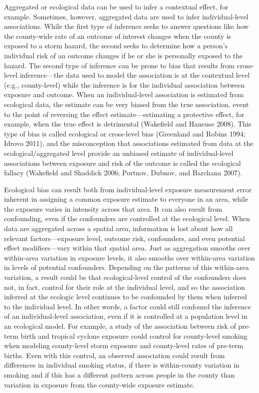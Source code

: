 \documentclass[]{article}
\begin{document}
Aggregated or ecological data can be used to infer a contextual effect,
for example. Sometimes, however, aggregated data are used to infer
individual-level associations. While the first type of inference seeks
to answer questions like how the county-wide rate of an outcome of
interest changes when the county is exposed to a storm hazard, the
second seeks to determine how a person's individual risk of an outcome
changes if he or she is personally exposed to the hazard. The second
type of inference can be prone to bias that results from cross-level
inference---the data used to model the association is at the contextual
level (e.g., county-level) while the inference is for the individual
association between exposure and outcome. When an individual-level
association is estimated from ecological data, the estimate can be very
biased from the true association, event to the point of reversing the
effect estimate---estimating a protective effect, for example, when the
true effect is detrimental (Wakefield and Haneuse 2008). This type of
bias is called ecological or cross-level bias (Greenland and Robins
1994; Idrovo 2011), and the misconception that associations estimated
from data at the ecological/aggregated level provide an unbiased
estimate of individual-level associations between exposure and risk of
the outcome is called the ecological fallacy (Wakefield and Shaddick
2006; Portnov, Dubnov, and Barchana 2007).

Ecological bias can result both from individual-level exposure
measurement error inherent in assigning a common exposure estimate to
everyone in an area, while the exposure varies in intensity across that
area. It can also result from confounding, even if the confounders are
controlled at the ecological level. When data are aggregated across a
spatial area, information is lost about how all relevant
factors---exposure level, outcome risk, confounders, and even potential
effect modifiers---vary within that spatial area. Just as aggregation
smooths over within-area variation in exposure levels, it also smooths
over within-area variation in levels of potential confounders. Depending
on the patterns of this within-area variation, a result could be that
ecological-level control of the confounders does not, in fact, control
for their role at the individual level, and so the association inferred
at the ecologic level continues to be confounded by them when inferred
to the individual level. In other words, a factor could still confound
the inference of an individual-level association, even if it is
controlled at a population level in an ecological model. For example, a
study of the association between risk of pre-term birth and tropical
cyclone exposure could control for county-level smoking when modeling
county-level storm exposure and county-level rates of pre-term births.
Even with this control, an observed association could result from
differences in individual smoking status, if there is within-county
variation in smoking and if this has a different pattern across people
in the county than variation in exposure from the county-wide exposure
estimate.
\end{document}
